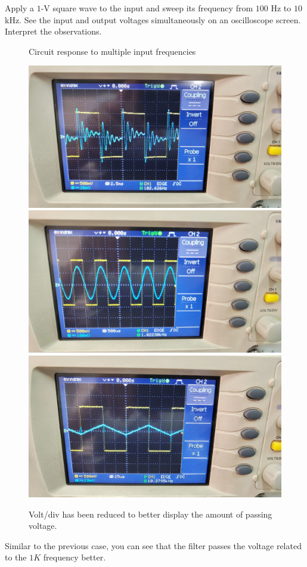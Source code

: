 \documentclass[11pt]{article}
\begin{document}
\begin{question}
\begin{subquestion}{Apply a $1$-V square wave to the input and sweep its frequency from $100$ Hz to $10$ kHz. See the input and output voltages simultaneously on an oscilloscope screen. Interpret the observations.}
{\begin{figure}[H]
                \caption{Circuit response to multiple input frequencies}
            \end{figure}
            \begin{figure}[H]
                \centering
                \includegraphics[scale=0.1,angle=0]{Fig/25.jpeg}
                \includegraphics[scale=0.1,angle=0]{Fig/26.jpeg}
                \includegraphics[scale=0.1,angle=0]{Fig/27.jpeg}
                \caption{Volt/div has been reduced to better display the amount of passing voltage.}
            \end{figure}
            Similar to the previous case, you can see that the filter passes the voltage related to the $1K$ frequency better. \\

}
\end{subquestion}
\end{question}
\end{document}
